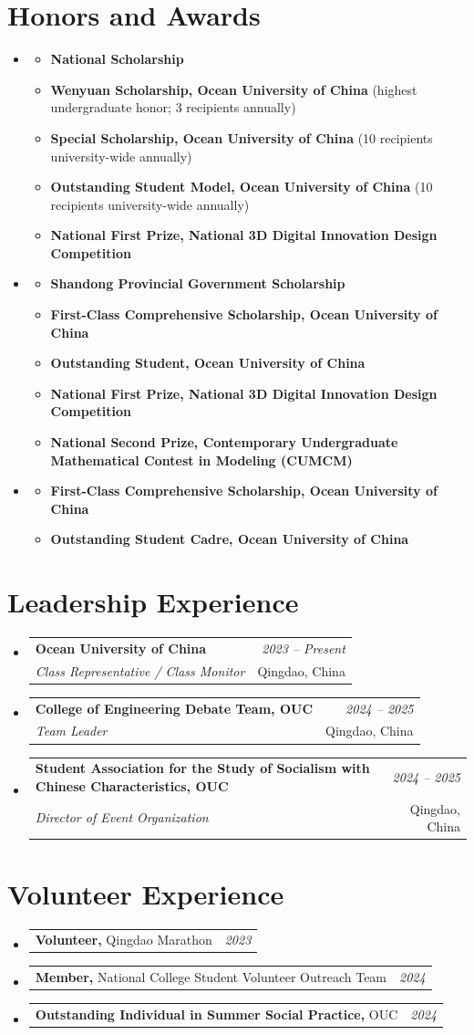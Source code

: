 \documentclass[a4paper,11pt]{article}
\makeatletter
\newcommand{\resumePOR}[3]{
\vspace{0.5mm}\item
    \begin{tabular*}{0.97\textwidth}[t]{l@{\extracolsep{\fill}}r}
        \textbf{#1}\hspace{0.3mm}#2 & \textit{\small{#3}}
    \end{tabular*}
    \vspace{-2mm}
}
\newcommand{\resumeSubheading}[4]{
\vspace{0.5mm}\item
    \begin{tabular*}{0.98\textwidth}[t]{l@{\extracolsep{\fill}}r}
        \textbf{#1} & \textit{\footnotesize{#4}} \\
        \textit{\footnotesize{#3}} &  \footnotesize{#2}\\
    \end{tabular*}
    \vspace{-2.4mm}
}
\renewcommand{\labelitemi}{$\vcenter{\hbox{\tiny$\bullet$}}$}
\newcommand{\resumeSubHeadingListStart}{\begin{itemize}[leftmargin=*,labelsep=1mm]}
\newcommand{\resumeSubHeadingListEnd}{\end{itemize}\vspace{2mm}}
\newcommand{\resumeYearListStart}{\begin{itemize}[leftmargin=10mm, labelwidth=8mm, labelsep=2mm, align=left, itemsep=1mm]}
\newcommand{\resumeYearListEnd}{\end{itemize}\vspace{-4mm}}
\newcommand{\resumeYear}[1]{\item[\textbf{#1}]\begin{itemize}[leftmargin=*, labelsep=1mm, label=\labelitemi, nosep]}
\newcommand{\resumeYearEnd}{\end{itemize}}
\newcommand{\resumeAward}[2]{\item\textbf{#1}#2}
\makeatother
\begin{document}
\section{\textbf{Honors and Awards}}
\vspace{-0.4mm}
\resumeYearListStart

\resumeYear{2026}
  \resumeAward{National Scholarship}{}
  \resumeAward{Wenyuan Scholarship, Ocean University of China}{ (highest undergraduate honor; 3 recipients annually)}
  \resumeAward{Special Scholarship, Ocean University of China}{ (10 recipients university-wide annually)}
  \resumeAward{Outstanding Student Model, Ocean University of China}{ (10 recipients university-wide annually)}
  \resumeAward{National First Prize, National 3D Digital Innovation Design Competition}{}
\resumeYearEnd

\resumeYear{2025}
  \resumeAward{Shandong Provincial Government Scholarship}{}
  \resumeAward{First-Class Comprehensive Scholarship, Ocean University of China}{}
  \resumeAward{Outstanding Student, Ocean University of China}{}
  \resumeAward{National First Prize, National 3D Digital Innovation Design Competition}{}
  \resumeAward{National Second Prize, Contemporary Undergraduate Mathematical Contest in Modeling (CUMCM)}{}
\resumeYearEnd

\resumeYear{2024}
  \resumeAward{First-Class Comprehensive Scholarship, Ocean University of China}{}
  \resumeAward{Outstanding Student Cadre, Ocean University of China}{}
\resumeYearEnd

\resumeYearListEnd

\section{\textbf{Leadership Experience}}
\vspace{-0.4mm}
\resumeSubHeadingListStart
\resumeSubheading
{Ocean University of China}{Qingdao, China}
{Class Representative / Class Monitor}{2023 -- Present}
\resumeSubheading
{College of Engineering Debate Team, OUC}{Qingdao, China}
{Team Leader}{2024 -- 2025}
\resumeSubheading
{Student Association for the Study of Socialism with Chinese Characteristics, OUC}{Qingdao, China}
{Director of Event Organization}{2024 -- 2025}
\resumeSubHeadingListEnd
\vspace{-6mm}

\section{\textbf{Volunteer Experience}}
\vspace{-0.4mm}
\resumeSubHeadingListStart
\resumePOR{Volunteer,}{ Qingdao Marathon}{2023}
\resumePOR{Member,}{ National College Student Volunteer Outreach Team}{2024}
\resumePOR{Outstanding Individual in Summer Social Practice,}{ OUC}{2024}
\resumeSubHeadingListEnd
\vspace{-2mm}
\end{document}

